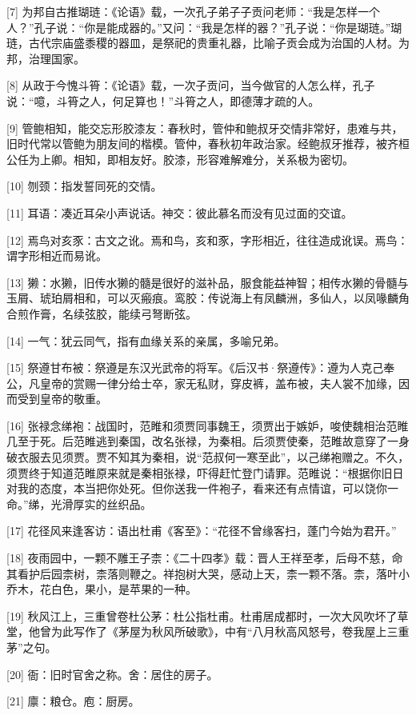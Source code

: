 \documentclass[12pt,UTF8]{ctexbook}
\begin{document}
[7] 为邦自古推瑚琏：《论语》载，一次孔子弟子子贡问老师：“我是怎样一个人？”孔子说：“你是能成器的。”又问：“我是怎样的器？”孔子说：“你是瑚琏。”瑚琏，古代宗庙盛黍稷的器皿，是祭祀的贵重礼器，比喻子贡会成为治国的人材。为邦，治理国家。

[8] 从政于今愧斗筲：《论语》载，一次子贡问，当今做官的人怎么样，孔子说：“噫，斗筲之人，何足算也！”斗筲之人，即德薄才疏的人。

[9] 管鲍相知，能交忘形胶漆友：春秋时，管仲和鲍叔牙交情非常好，患难与共，旧时代常以管鲍为朋友间的楷模。管仲，春秋初年政治家。经鲍叔牙推荐，被齐桓公任为上卿。相知，即相友好。胶漆，形容难解难分，关系极为密切。

[10] 刎颈：指发誓同死的交情。

[11] 耳语：凑近耳朵小声说话。神交：彼此慕名而没有见过面的交谊。

[12] 焉鸟对亥豕：古文之讹。焉和鸟，亥和豕，字形相近，往往造成讹误。焉鸟：谓字形相近而易讹。

[13] 獭：水獭，旧传水獭的髓是很好的滋补品，服食能益神智；相传水獭的骨髓与玉屑、琥珀屑相和，可以灭瘢痕。鸾胶：传说海上有凤麟洲，多仙人，以凤喙麟角合煎作膏，名续弦胶，能续弓弩断弦。

[14] 一气：犹云同气，指有血缘关系的亲属，多喻兄弟。

[15] 祭遵甘布被：祭遵是东汉光武帝的将军。《后汉书·祭遵传》：遵为人克己奉公，凡皇帝的赏赐一律分给士卒，家无私财，穿皮裤，盖布被，夫人裳不加缘，因而受到皇帝的敬重。

[16] 张禄念绨袍：战国时，范睢和须贾同事魏王，须贾出于嫉妒，唆使魏相治范睢几至于死。后范睢逃到秦国，改名张禄，为秦相。后须贾使秦，范睢故意穿了一身破衣服去见须贾。贾不知其为秦相，说“范叔何一寒至此”，以己绨袍赠之。不久，须贾终于知道范睢原来就是秦相张禄，吓得赶忙登门请罪。范睢说：“根据你旧日对我的态度，本当把你处死。但你送我一件袍子，看来还有点情谊，可以饶你一命。”绨，光滑厚实的丝织品。

[17] 花径风来逢客访：语出杜甫《客至》：“花径不曾缘客扫，蓬门今始为君开。”

[18] 夜雨园中，一颗不雕王子柰：《二十四孝》载：晋人王祥至孝，后母不慈，命其看护后园柰树，柰落则鞭之。祥抱树大哭，感动上天，柰一颗不落。柰，落叶小乔木，花白色，果小，是苹果的一种。

[19] 秋风江上，三重曾卷杜公茅：杜公指杜甫。杜甫居成都时，一次大风吹坏了草堂，他曾为此写作了《茅屋为秋风所破歌》，中有“八月秋高风怒号，卷我屋上三重茅”之句。

[20] 衙：旧时官舍之称。舍：居住的房子。

[21] 廪：粮仓。庖：厨房。
\end{document}
